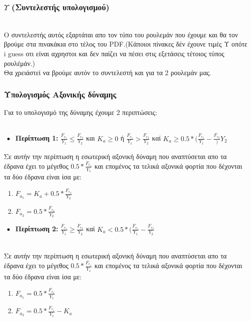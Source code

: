 \documentclass{article}
\begin{document}
\subsubsection{$Υ$ (Συντελεστής υπολογισμού) }
\\
Ο συντελεστής αυτός εξαρτάται απο τον τύπο του ρουλεμάν που έχουμε και θα τον βρούμε στα πινακάκια στο τέλος του PDF.(Κάποιοι πίνακες δέν έχουνε τιμές Υ οπότε i guess οτι είναι αχρηστοι και δεν παίζει να πέσει στις εξετάσεις τέτοιος τύπος ρουλέμάν.)
\\
Θα χρειάστεί να βρούμε αυτόν το συντελεστή και για τα 2 ρουλεμάν μας.
\\
\subsubsection{Υπολογισμός Αξονικής δύναμης}
Για το υπολογισμό της δύναμης έχουμε 2 περιπτώσεις:
\\
\\

\begin{itemize}
    \item \textbf{Περίπτωση 1:} $\frac{F_r_1}{Y_1} \leq \frac{F_r_2}{Y_2}$ και $K_a \geq 0$ ή $\frac{F_r_1}{Y_1} > \frac{F_r_2}{Y_2}$ καί $K_a \geq 0.5*(\frac{F_r_1}{Y_1} - \frac{F_r_2}){Y_2}$
\end{itemize}
Σε αυτήν την περίπτωση η εσωτερική αξονική δύναμη που αναπτύσεται απο τα έδρανα έχει το μέγεθος $0.5*\frac{F_r_1}{Y_1}$  και επομένος τα τελικά αξονικά φορτία που δέχονται τα δύο έδρανα είναι ίσα με:
\begin{enumerate}
    \item $F_a_1 = K_a + 0.5*\frac{F_r_2}{Y_2}$
    \item $F_a_2 = 0.5*\frac{F_r_2}{Y_2}$
\end{enumerate}
\vspace{5}



\begin{itemize}
    \item \textbf{Περίπτωση 2:} $\frac{F_r_1}{Y_1} \geq \frac{F_r_2}{Y_2}$ καί $K_a < 0.5*(\frac{F_r_1}{Y_1} - \frac{F_r_2}{Y_2}$
\end{itemize}
\\
Σε αυτήν την περίπτωση η εσωτερική αξονική δύναμη που αναπτύσεται απο τα έδρανα έχει το μέγεθος $0.5*\frac{F_r_1}{Y_1}$  και επομένος τα τελικά αξονικά φορτία που δέχονται τα δύο έδρανα είναι ίσα με:
\begin{enumerate}
    \item $F_a_1 = 0.5*\frac{F_r_1}{Y_1}$
    \item $F_a_2 = 0.5*\frac{F_r_1}{Y_1} - K_a$
\end{enumerate}
\end{document}
